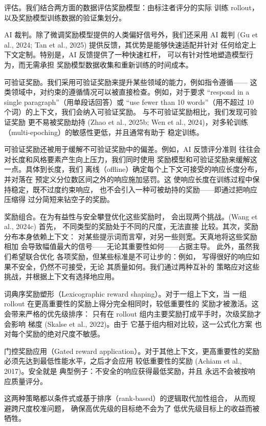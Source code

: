 评估。我们结合两方面的数据评估奖励模型：由标注者评分的实际
训练 rollout，以及奖励模型训练数据的验证集划分。

AI 裁判。除了微调奖励模型提供的人类偏好信号外，我们还采用
AI 裁判 (Gu et al., 2024; Tan et
al., 2025) 提供反馈，其优势是能够快速适配并针对
任何给定上下文定制。特别是，AI 反馈提供了一种快速杠杆，
可以有针对性地塑造模型行为，而无需承担
奖励模型数据收集和重新训练的时间成本。

可验证奖励。我们采用可验证奖励来提升某些领域的能力，例如指令遵循——
这类领域中，对约束的遵循情况可以被直接检查。例如，对于要求
``respond in a single paragraph''（用单段话回答）或 ``use fewer
than 10 words''（用不超过 10 个词）的上下文，我们会纳入可验证奖励。
与不可验证奖励相比，我们发现可验证奖励
更不易被奖励劫持 (Zhao et al., 2025b; Wen et
al., 2024)，对多轮训练（multi-epoching）的敏感性更低，并且通常有助于
稳定训练。

可验证奖励还被用于缓解不可验证奖励中的偏差。例如，AI 反馈评分准则
往往会对长度和风格要素产生向上压力，我们同时使用
奖励模型和可验证奖励来缓解这一点。具体到长度，我们
离线（offline）确定每个上下文可接受的响应长度分布，并对落在
预定义分位数区间之外的响应施加惩罚。这
使响应长度在训练过程中保持稳定，既不过度约束响应，
也不会引入一种可被劫持的奖励——即通过把响应压缩得
过分简短来钻空子的奖励。

奖励组合。在为有益性与安全攀登优化这些奖励时，
会出现两个挑战。(Wang et al., 2024c) 首先，
不同类型的奖励处于不同的尺度，无法直接
比较。其次，奖励分布本身依赖上下文：
对某些提示词而言窄，对另一些则宽。天真地将这些奖励相加
会导致幅值最大的信号——无论其重要性如何——占据主导。
此外，虽然我们希望联合优化
各项奖励，但某些标准是不可让步的：例如，
写得很好的响应如果不安全，仍然不可接受，无论
其质量如何。我们通过两种互补的
策略应对这些挑战，并根据上下文有选择地应用。

词典序奖励塑形（Lexicographic reward shaping）。对于一组上下文，当
一组 rollout 在更高重要性的奖励上得分完全相同时，较低重要性的
奖励才被激活。这会带来严格的优先级排序：
只有在 rollout 组内主要奖励打成平手时，次级奖励才会影响
梯度 (Skalse et al., 2022)。由于
它基于组内相对比较，这一公式化方案
也对每个奖励的绝对尺度不敏感。

门控奖励应用（Gated reward application）。对于其他上下文，更高重要性的奖励
必须先达到最低性能水平，之后才会应用
较低重要性的奖励 (Achiam et al., 2017)。安全就是
典型例子：不安全的响应获得最低奖励，并且
永远不会被按响应质量评分。



这两种策略都以条件式或基于排序（rank-based）的逻辑取代加性组合，
从而规避跨尺度校准问题，
确保高优先级的目标绝不会为了
低优先级目标上的收益而被牺牲。

